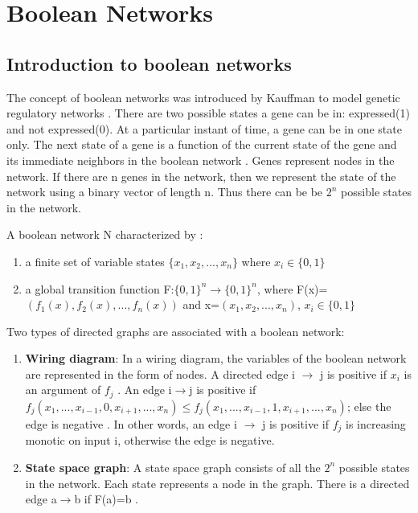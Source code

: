 \documentclass[11pt]{report}
\begin{document}
  \chapter{Boolean Networks}
  \section{\color{red} Introduction to boolean networks}
    The concept of boolean networks was introduced by Kauffman to model genetic regulatory networks \cite{Goles2010,Kauffman1969}.
    There are two possible states a gene can be in: expressed(1) and not expressed(0). At a particular instant of time, a gene can
    be in one state only. The next state of a gene is a function of the current state of the gene and its immediate neighbors
    in the boolean network \cite{Dimitrova2011}. Genes represent nodes in the network. If there are n genes in the network, then we represent the state of the network using a binary vector
    of length n. Thus there can be be $2^n$ possible states in the network.
    
    A boolean network N characterized by \cite{Goles2010}:
    \begin{enumerate}
     \item a finite set of variable states $\{x_{1},x_{2},...,x_{n}\}$ where $x_{i} \in \{0,1\}$
     \item a global transition function F:$\{0,1\}^{n} \to \{0,1\}^{n}$, where F(x)=$(f_{1}(x),f_{2}(x),...,f_{n}(x))$ and
     x=$(x_{1},x_{2},...,x_{n})$, $x_{i} \in \{0,1\}$
    \end{enumerate}
    
    Two types of directed graphs are associated with a boolean network:
    \begin {enumerate}
     \item \textbf{Wiring diagram}: In a wiring diagram, the variables of the boolean network are represented in the form of nodes.
     A directed edge i $\to$ j is positive if $x_{i}$ is an argument of $f_{j}$ \cite{Dimitrova2011}. An edge i$\to$j is positive if 
     $f_{j}(x_{1},...,x_{i-1},0,x_{i+1},...,x_{n}) \leq f_{j}(x_{1},...,x_{i-1},1,x_{i+1},...,x_{n})$; else the edge is negative \cite{Veliz-Cuba2011}.
     In other words, an edge i $\to$ j is positive if $f_{j}$ is increasing monotic \cite{Goles2010} on input i, otherwise the edge is negative.
     \item \textbf{State space graph}: A state space graph consists of all the $2^{n}$ possible states in the network. Each state 
     represents a node in the graph. There is a directed edge a$\to$b if F(a)=b \cite{Dimitrova2011}.
    \end {enumerate}
    
\end{document}
